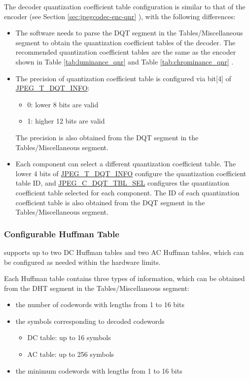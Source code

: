\documentclass[main\_\_EN.tex]{subfiles}
\begin{document}
The decoder quantization coefficient table configuration is similar to that of the encoder (see Section \ref{sec:jpegcodec-enc-qnr} \textit{}), with the following differences:
\begin{itemize}
    \item The software needs to parse the DQT segment in the Tables/Miscellaneous segment to obtain the quantization coefficient tables of the decoder. The recommended quantization coefficient tables are the same as the encoder shown in Table \ref{tab:luminance_qnr} \textit{} and Table \ref{tab:chrominance_qnr} \textit{}.
    \item The precision of quantization coefficient table  is configured via bit[4] of \hyperref[regdesc:JPEGDQTINFOREG]{JPEG\_T\_DQT\_INFO}:
    \begin{itemize}
        \item 0: lower 8 bits are valid
        \item 1: higher 12 bits are valid
    \end{itemize}
    The precision is also obtained from the DQT segment in the Tables/Miscellaneous segment.
    \item Each component can select a different quantization coefficient table. The lower 4 bits of \hyperref[regdesc:JPEGDQTINFOREG]{JPEG\_T\_DQT\_INFO} configure the quantization coefficient table ID, and \hyperref[fielddesc:JPEGC0DQTTBLSEL]{JPEG\_C\_DQT\_TBL\_SEL} configures the quantization coefficient table selected for each component. The ID of each quantization coefficient table is also obtained from the DQT segment in the Tables/Miscellaneous segment.
\end{itemize}

\subsubsection{Configurable Huffman Table}
\label{sec:jpegcodec-dec-huffman}

\chipname{} supports up to two DC Huffman tables and two AC Huffman tables, which can be configured as needed within the hardware limits.

Each Huffman table contains three types of information, which can be obtained from the DHT segment in the Tables/Miscellaneous segment:
\begin{itemize}
    \item the number of codewords with lengths from 1 to 16 bits
    \item the symbols corresponding to decoded codewords
    \begin{itemize}
        \item DC table: up to 16 symbols
        \item AC table: up to 256 symbols
    \end{itemize}
    \item the minimum codewords with lengths from 1 to 16 bits
\end{itemize}
\end{document}
